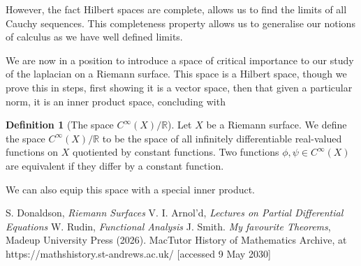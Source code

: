 \documentclass[a4paper,12pt]{report}
\theoremstyle{plain}
\theoremstyle{definition}
\newtheorem{defn}[thm]{Definition}
\begin{document}
However, the fact Hilbert spaces are complete, allows us to find the limits of all Cauchy sequences. This completeness property allows us to generalise our notions of calculus as we have well defined limits.

We are now in a position to introduce a space of critical importance to our study of the laplacian on a Riemann surface. This space is a Hilbert space, though we prove this in steps, first showing it is a vector space, then that given a particular norm, it is an inner product space, concluding with

\begin{defn}[The space $C^{\infty}(X)/\mathbb{R}$]
  Let $X$ be a Riemann surface. We define the space $C^{\infty}(X)/\mathbb{R}$ to be the space of all infinitely differentiable real-valued functions on $X$ quotiented by constant functions. Two functions $\phi, \psi \in C^{\infty}(X)$ are equivalent if they differ by a constant function.
\end{defn}

We can also equip this space with a special inner product.
%
\begin{thebibliography}{99}
 S. Donaldson, {\em Riemann Surfaces}
 V. I. Arnol'd, {\em Lectures on Partial Differential Equations}
 W. Rudin, {\em Functional Analysis}
 J. Smith. {\em My favourite Theorems}, Madeup University
Press (2026).
%
 MacTutor History of Mathematics Archive, at https://mathshistory.st-andrews.ac.uk/ [accessed 9 May 2030]
\end{thebibliography}
\end{document}
